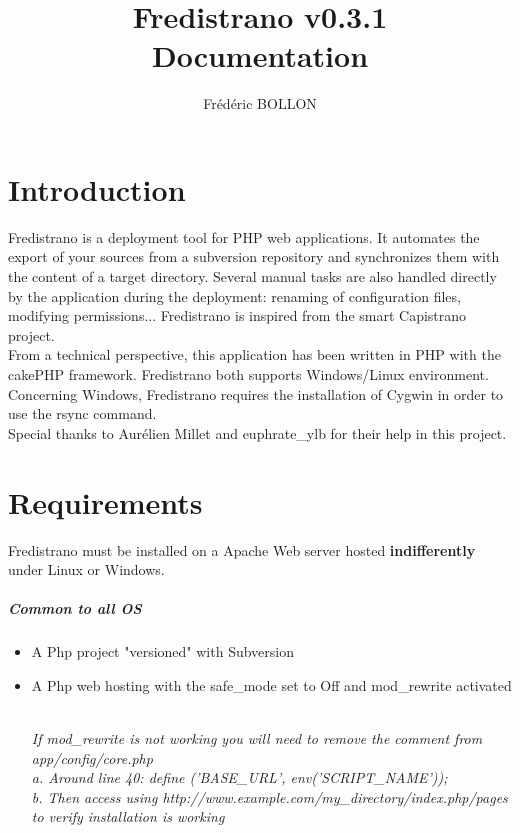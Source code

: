 \documentclass[12pt,a4paper]{report}
\author{Frédéric BOLLON}
\title{Fredistrano v0.3.1\\Documentation\\}
\begin{document}
\maketitle
\tableofcontents

\chapter{Introduction}
Fredistrano is a deployment tool for PHP web applications. It automates the export of your sources from a subversion repository and synchronizes them with the content of a target directory. Several manual tasks are also handled directly by the application during the deployment: renaming of configuration files, modifying permissions... Fredistrano is inspired from the smart Capistrano project.\\

From a technical perspective, this application has been written in PHP with the cakePHP framework. Fredistrano both supports Windows/Linux environment. Concerning Windows, Fredistrano requires the installation of Cygwin in order to use the rsync command.\\

Special thanks to Aurélien Millet and euphrate\_ylb for their help in this project.

\chapter{Requirements}
Fredistrano must be installed on a Apache Web server hosted \textbf{indifferently} under Linux or Windows.
\paragraph*{Common to all OS}
\begin{itemize}
\item 
A Php project "versioned" with Subversion
\item 
A Php web hosting with the safe\_mode set to Off and mod\_rewrite activated\\\\
\begin{small}\textit{If mod\_rewrite is not working you will need to remove the comment from app/config/core.php\\
      a. Around line 40: define ('BASE\_URL', env('SCRIPT\_NAME'));\\
      b. Then access using http://www.example.com/my\_directory/index.php/pages to verify installation is working}\end{small}
\end{itemize}
\end{document}

